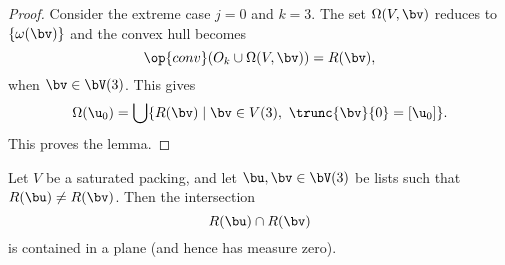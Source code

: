 \begin{proof}
Consider  the extreme case $j=0$ and $k=3$.  The set $\Omega(V,\bv)$
reduces to $\{\omega(\bv)\}$  and the convex hull becomes
\begin{displaymath}
\op{conv}(O_{k}\cup \Omega(V,\bv)) = R(\bv),
\end{displaymath}
when $\bv\in \bV(3)$.
This gives
\begin{equation}
\Omega(\u_0) = \bigcup \{ R(\bv) \mid \bv\in V(3),~\trunc{\bv}{0} =[\u_0]\}.
\end{equation}
This proves the lemma.
\end{proof}



\begin{lemma}  \label{lemma:R-inter}
Let $V$ be a saturated packing, and let $\bu,\bv\in \bV(3)$ be lists such that 
$R(\bu)\ne R(\bv)$.  Then the intersection 
\begin{displaymath}
R(\bu)\cap R(\bv)
\end{displaymath}
is contained in a plane (and hence has measure zero).
\end{lemma}

